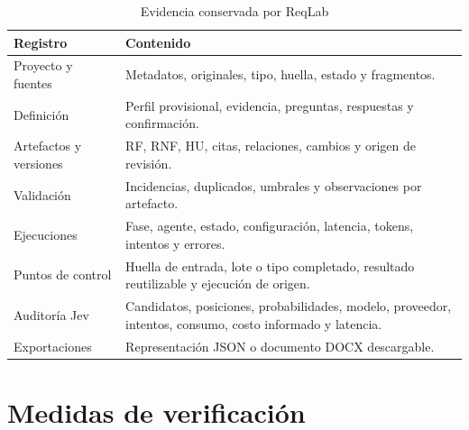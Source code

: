 \begin{table}[H]
  \centering
  \caption{Evidencia conservada por ReqLab}
  \label{tab:salidas-corrida}
  \small
  \begin{tabularx}{\textwidth}{p{4.0cm}Y}
    \toprule
    Registro & Contenido \\
    \midrule
    Proyecto y fuentes & Metadatos, originales, tipo, huella, estado y fragmentos. \\
    Definición & Perfil provisional, evidencia, preguntas, respuestas y confirmación. \\
    Artefactos y versiones & RF, RNF, HU, citas, relaciones, cambios y origen de revisión. \\
    Validación & Incidencias, duplicados, umbrales y observaciones por artefacto. \\
    Ejecuciones & Fase, agente, estado, configuración, latencia, tokens, intentos y errores. \\
    Puntos de control & Huella de entrada, lote o tipo completado, resultado reutilizable y ejecución de origen. \\
    Auditoría Jev & Candidatos, posiciones, probabilidades, modelo, proveedor, intentos, consumo, costo informado y latencia. \\
    Exportaciones & Representación JSON o documento DOCX descargable. \\
    \bottomrule
  \end{tabularx}
\end{table}

\section{Medidas de verificación}

